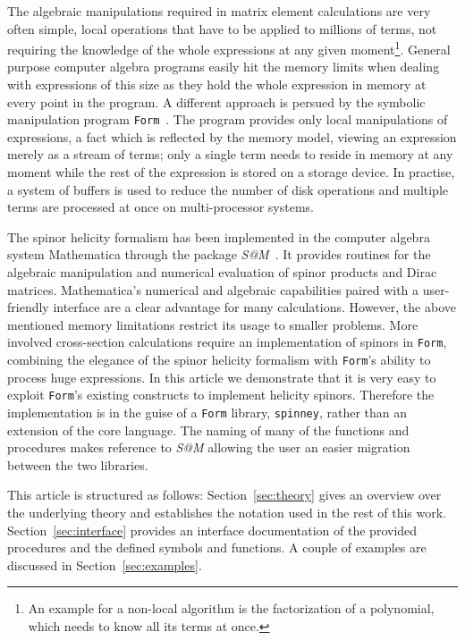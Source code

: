 \documentclass[preprint,number,12pt,sort&compress]{elsarticle}
\makeatletter
\newcommand{\FORM}{{\texttt{Form}}}
\newcommand{\spinney}{{\texttt{spinney}}}
\newcommand{\SAM}{\textit{S@M}}
\makeatother
\begin{document}
The algebraic manipulations required in matrix element calculations
are very often simple, local operations that have to be applied to millions
of terms, not requiring the knowledge of the whole expressions at
any given moment\footnote{An example for a non-local algorithm is the
factorization of a polynomial, which needs to know all its terms at once.}.
General purpose computer algebra programs easily hit the memory limits
when dealing with expressions of this size as they hold the whole expression
in memory at every point in the program. A different approach is persued
by the symbolic manipulation program \FORM{}~\cite{Vermaseren:2000nd}.
The program provides only
local manipulations of expressions, a fact which is reflected by the
memory model,
viewing an expression merely as a stream of terms; only a single term needs
to reside in memory at any moment while the rest of the expression is stored
on a storage device. In practise, a system of buffers is used to
reduce the number of disk operations and multiple terms are processed at
once on multi-processor systems.

The spinor helicity formalism has been implemented in the computer algebra
system Mathematica through the package \SAM~\cite{Maitre:2007jq}.
It provides routines for the algebraic manipulation and numerical evaluation
of spinor products and Dirac matrices. Mathematica's numerical and algebraic
capabilities paired with a user-friendly interface are a clear advantage
for many calculations. However, the above mentioned memory limitations
restrict its usage to smaller problems. More involved cross-section
calculations require an implementation of spinors in \FORM{}, combining
the elegance of the spinor helicity formalism with \FORM{}'s ability
to process huge expressions. In this article we demonstrate that it is
very easy to exploit \FORM{}'s existing constructs to implement
helicity spinors. Therefore the implementation is in the guise of a
\FORM{} library, \spinney{}, rather than an extension of the core language.
The naming of many of the functions and procedures makes reference to
\SAM{} allowing the user an easier migration between the two libraries.

This article is structured as follows: Section~\ref{sec:theory} gives an
overview over the underlying theory and establishes the notation used
in the rest of this work. Section~\ref{sec:interface} provides an interface
documentation of the provided procedures and the defined symbols and functions.
A couple of examples are discussed in Section~\ref{sec:examples}.
\end{document}
